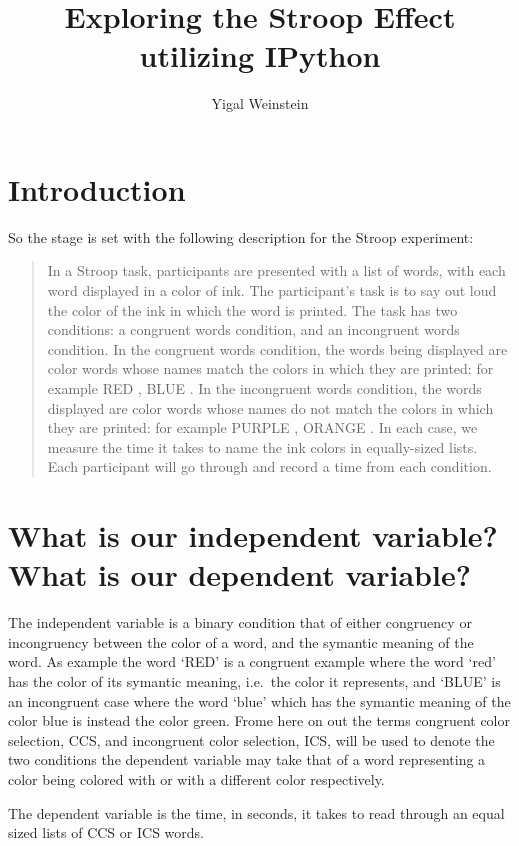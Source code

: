 \documentclass{article}
\title{Exploring the Stroop Effect utilizing IPython}
\author{Yigal Weinstein}
\begin{document}
\maketitle
\section*{Introduction}
So the stage is set with the following description for the Stroop experiment:
\begin{quote}
In a Stroop task, participants are presented with a list of words, with
each word displayed in a color of ink. The participant's task is to say
out loud the color of the ink in which the word is printed. The task has
two conditions: a congruent words condition, and an incongruent words
condition. In the congruent words condition, the words being displayed
are color words whose names match the colors in which they are printed:
for example {\color{red} RED }, {\color{blue} BLUE }. In the incongruent words condition, the words
displayed are color words whose names do not match the colors in which
they are printed: for example { \color{yellow}PURPLE }, {\color{green} ORANGE }. In each case, we measure
the time it takes to name the ink colors in equally-sized lists. Each
participant will go through and record a time from each condition.
\cite{Udacity-P1-Stroop}
\end{quote}
\section{What is our independent variable? What is our dependent
variable?}
\label{sec:question1}
The independent variable is a binary condition that of either congruency or
incongruency between the color of a word, and the symantic meaning of the word.
As example the word `RED' is a congruent example where the word `red' has the
color of its symantic meaning, i.e.~the color it represents, and `BLUE' is an
incongruent case where the word `blue' which has the symantic meaning of the
color blue is instead the color green. Frome here on out the terms congruent
color selection, CCS, and incongruent color selection, ICS, will be used to
denote the two conditions the dependent variable may take that of a word
representing a color being colored with or with a different color respectively.

The dependent variable is the time, in seconds, it takes to read through an
equal sized lists of CCS or ICS words.  
\end{document}
